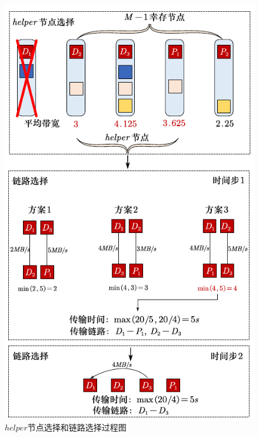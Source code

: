 \begin{figure}[tb!]
	\centering
	\includegraphics [scale=0.9]{figures/3.4.pdf}
	\caption{$helper$节点选择和链路选择过程图}
	\label{fig:3.4}
\end{figure}



